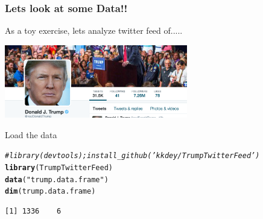 \documentclass{beamer}\usepackage[]{graphicx}\usepackage[]{color}
\makeatletter
\newcommand{\hlstr}[1]{\textcolor[rgb]{0.2,0.2,0.2}{#1}}%
\newcommand{\hlcom}[1]{\textcolor[rgb]{0.302,0.302,0.302}{\textit{#1}}}%
\newcommand{\hlstd}[1]{\textcolor[rgb]{0.102,0.102,0.102}{#1}}%
\newcommand{\hlkwd}[1]{\textcolor[rgb]{0.102,0.102,0.102}{\textbf{#1}}}%
\newenvironment{kframe}{%
 \def\at@end@of@kframe{}%
 \ifinner\ifhmode%
  \def\at@end@of@kframe{\end{minipage}}%
  \begin{minipage}{\columnwidth}%
 \fi\fi%
 \def\FrameCommand##1{\hskip\@totalleftmargin \hskip-\fboxsep
 \colorbox{shadecolor}{##1}\hskip-\fboxsep
     \hskip-\linewidth \hskip-\@totalleftmargin \hskip\columnwidth}%
 \MakeFramed {\advance\hsize-\width
   \@totalleftmargin\z@ \linewidth\hsize
   \@setminipage}}%
 {\par\unskip\endMakeFramed%
 \at@end@of@kframe}
\newenvironment{knitrout}{}{} %
\renewenvironment{knitrout}{\begin{spacing}{0.75}\begin{tiny}}{\end{tiny}\end{spacing}}
\makeatother
\begin{document}
\begin{frame}[fragile]
\frametitle{Lets look at some Data!!}

As a toy exercise, lets analyze twitter feed of..... \pause \newline

\includegraphics[width=8cm,keepaspectratio]{trump.png}

Load the data 





\begin{knitrout}\small
{}\color{fgcolor}\begin{kframe}
\begin{alltt}
\hlcom{#library(devtools); install_github('kkdey/TrumpTwitterFeed')}
\hlkwd{library}\hlstd{(TrumpTwitterFeed)}
\hlkwd{data}\hlstd{(}\hlstr{"trump.data.frame"}\hlstd{)}
\hlkwd{dim}\hlstd{(trump.data.frame)}
\end{alltt}
\begin{verbatim}
[1] 1336    6
\end{verbatim}
\end{kframe}
\end{knitrout}
\end{frame}
\end{document}
